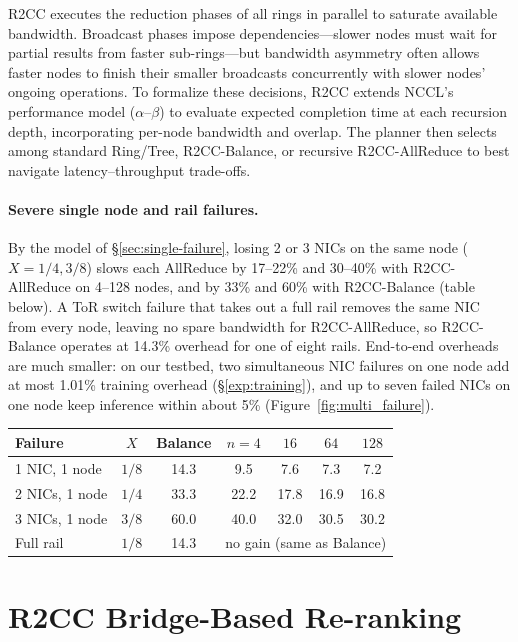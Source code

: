 R2CC executes the reduction phases of all rings in parallel to saturate available bandwidth. Broadcast phases impose dependencies—slower nodes must wait for partial results from faster sub-rings—but bandwidth asymmetry often allows faster nodes to finish their smaller broadcasts concurrently with slower nodes' ongoing operations. To formalize these decisions, R2CC extends NCCL’s performance model ($\alpha$–$\beta$) to evaluate expected completion time at each recursion depth, incorporating per-node bandwidth and overlap. The planner then selects among standard Ring/Tree, R2CC-Balance, or recursive R2CC-AllReduce to best navigate latency–throughput trade-offs.

\paragraph{Severe single node and rail failures.} By the model of \S\ref{sec:single-failure}, losing 2 or 3 NICs on the same node ($X=1/4, 3/8$) slows each AllReduce by 17--22\% and 30--40\% with R2CC-AllReduce on 4--128 nodes, and by 33\% and 60\% with R2CC-Balance (table below). A ToR switch failure that takes out a full rail removes the same NIC from every node, leaving no spare bandwidth for R2CC-AllReduce, so R2CC-Balance operates at 14.3\% overhead for one of eight rails. End-to-end overheads are much smaller: on our testbed, two simultaneous NIC failures on one node add at most 1.01\% training overhead (\S\ref{exp:training}), and up to seven failed NICs on one node keep inference within about 5\% (Figure~\ref{fig:multi_failure}).

\begin{center}
\small
\setlength{\tabcolsep}{4pt}
\begin{tabular}{lcccccc}
\toprule
Failure & $X$ & Balance & $n{=}4$ & $16$ & $64$ & $128$ \\
\midrule
1 NIC, 1 node & $1/8$ & 14.3 & 9.5 & 7.6 & 7.3 & 7.2 \\
2 NICs, 1 node & $1/4$ & 33.3 & 22.2 & 17.8 & 16.9 & 16.8 \\
3 NICs, 1 node & $3/8$ & 60.0 & 40.0 & 32.0 & 30.5 & 30.2 \\
Full rail & $1/8$ & 14.3 & \multicolumn{4}{c}{no gain (same as Balance)} \\
\bottomrule
\end{tabular}
\end{center}

\section{R2CC Bridge-Based Re-ranking}
\label{app:bridge-based}

